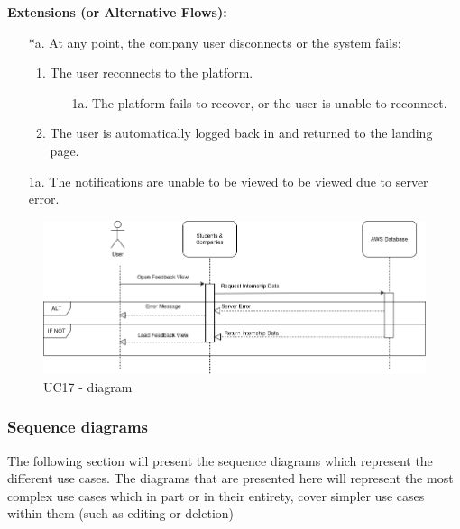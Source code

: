 \begin{itemize}[label={[\textbf{UC}]}, align=left, leftmargin=*]
    \textbf{Extensions (or Alternative Flows):} 
    \begin{enumerate}[label=\arabic*.]
        \item[*a.] At any point, the company user disconnects or the system fails:
            \begin{enumerate}[label=\arabic*.]
                \item The user reconnects to the platform.
                    \begin{enumerate}[label=\alph*.]
                        \item[1a.] The platform fails to recover, or the user is unable to reconnect.
                    \end{enumerate}
                 \item The user is automatically logged back in and returned to the landing page.
            \end{enumerate}
        \item[1a.] The notifications are unable to be viewed to be viewed due to server error.
        \end{enumerate}
\end{itemize}


     \begin{figure}[H]
    	\includegraphics[width=\textwidth,height=\textheight,keepaspectratio]{RASD-Latex/assets/Use Case Diagrams/UC17.png}
    	\caption{UC17 - diagram}
    	\label{fig:DataRequest}
    \end{figure}



\subsubsection{Sequence diagrams}
The following section will present the sequence diagrams which represent the different use cases. The diagrams that are presented here will represent the most complex use cases which in part or in their entirety, cover simpler use cases within them (such as editing or deletion)
